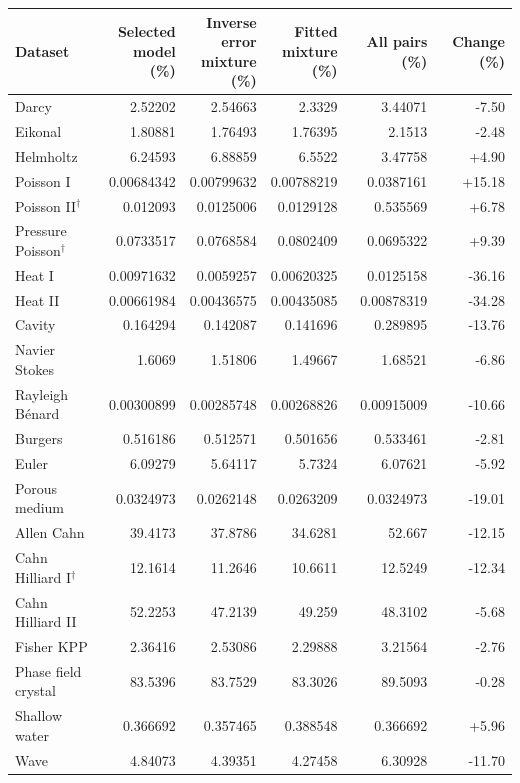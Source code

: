 \begin{tabular}{lrrrrr}
\toprule
Dataset & \shortstack[r]{Selected\\model\\(\%)} & \shortstack[r]{Inverse\\error\\mixture\\(\%)} & \shortstack[r]{Fitted\\mixture\\(\%)} & All pairs (\%) & Change (\%) \\
\midrule
Darcy & 2.52202 & 2.54663 & 2.3329 & 3.44071 & -7.50 \\
Eikonal & 1.80881 & 1.76493 & 1.76395 & 2.1513 & -2.48 \\
Helmholtz & 6.24593 & 6.88859 & 6.5522 & 3.47758 & +4.90 \\
Poisson I & 0.00684342 & 0.00799632 & 0.00788219 & 0.0387161 & +15.18 \\
Poisson II$^{\dagger}$ & 0.012093 & 0.0125006 & 0.0129128 & 0.535569 & +6.78 \\
Pressure Poisson$^{\dagger}$ & 0.0733517 & 0.0768584 & 0.0802409 & 0.0695322 & +9.39 \\
Heat I & 0.00971632 & 0.0059257 & 0.00620325 & 0.0125158 & -36.16 \\
Heat II & 0.00661984 & 0.00436575 & 0.00435085 & 0.00878319 & -34.28 \\
Cavity & 0.164294 & 0.142087 & 0.141696 & 0.289895 & -13.76 \\
Navier Stokes & 1.6069 & 1.51806 & 1.49667 & 1.68521 & -6.86 \\
Rayleigh Bénard & 0.00300899 & 0.00285748 & 0.00268826 & 0.00915009 & -10.66 \\
Burgers & 0.516186 & 0.512571 & 0.501656 & 0.533461 & -2.81 \\
Euler & 6.09279 & 5.64117 & 5.7324 & 6.07621 & -5.92 \\
Porous medium & 0.0324973 & 0.0262148 & 0.0263209 & 0.0324973 & -19.01 \\
Allen Cahn & 39.4173 & 37.8786 & 34.6281 & 52.667 & -12.15 \\
Cahn Hilliard I$^{\dagger}$ & 12.1614 & 11.2646 & 10.6611 & 12.5249 & -12.34 \\
Cahn Hilliard II & 52.2253 & 47.2139 & 49.259 & 48.3102 & -5.68 \\
Fisher KPP & 2.36416 & 2.53086 & 2.29888 & 3.21564 & -2.76 \\
Phase field crystal & 83.5396 & 83.7529 & 83.3026 & 89.5093 & -0.28 \\
Shallow water & 0.366692 & 0.357465 & 0.388548 & 0.366692 & +5.96 \\
Wave & 4.84073 & 4.39351 & 4.27458 & 6.30928 & -11.70 \\
\bottomrule
\end{tabular}
